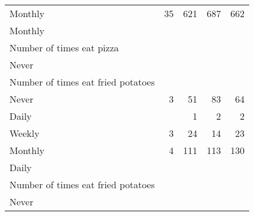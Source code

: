 \documentclass{article}
\begin{document}
\begin{tabular}{lllll}
\multicolumn{1}{l}{\hspace{5em}Monthly} &
  \multicolumn{1}{|r}{35} &
  \multicolumn{1}{r}{621} &
  \multicolumn{1}{r}{687} &
  \multicolumn{1}{r}{662} \\
\multicolumn{1}{l}{\hspace{1em}Monthly} &
  \multicolumn{1}{|r}{} &
  \multicolumn{1}{r}{} &
  \multicolumn{1}{r}{} &
  \multicolumn{1}{r}{} \\
\multicolumn{1}{l}{\hspace{2em}Number of times eat pizza} &
  \multicolumn{1}{|r}{} &
  \multicolumn{1}{r}{} &
  \multicolumn{1}{r}{} &
  \multicolumn{1}{r}{} \\
\multicolumn{1}{l}{\hspace{3em}Never} &
  \multicolumn{1}{|r}{} &
  \multicolumn{1}{r}{} &
  \multicolumn{1}{r}{} &
  \multicolumn{1}{r}{} \\
\multicolumn{1}{l}{\hspace{4em}Number of times eat fried potatoes} &
  \multicolumn{1}{|r}{} &
  \multicolumn{1}{r}{} &
  \multicolumn{1}{r}{} &
  \multicolumn{1}{r}{} \\
\multicolumn{1}{l}{\hspace{5em}Never} &
  \multicolumn{1}{|r}{3} &
  \multicolumn{1}{r}{51} &
  \multicolumn{1}{r}{83} &
  \multicolumn{1}{r}{64} \\
\multicolumn{1}{l}{\hspace{5em}Daily} &
  \multicolumn{1}{|r}{} &
  \multicolumn{1}{r}{1} &
  \multicolumn{1}{r}{2} &
  \multicolumn{1}{r}{2} \\
\multicolumn{1}{l}{\hspace{5em}Weekly} &
  \multicolumn{1}{|r}{3} &
  \multicolumn{1}{r}{24} &
  \multicolumn{1}{r}{14} &
  \multicolumn{1}{r}{23} \\
\multicolumn{1}{l}{\hspace{5em}Monthly} &
  \multicolumn{1}{|r}{4} &
  \multicolumn{1}{r}{111} &
  \multicolumn{1}{r}{113} &
  \multicolumn{1}{r}{130} \\
\multicolumn{1}{l}{\hspace{3em}Daily} &
  \multicolumn{1}{|r}{} &
  \multicolumn{1}{r}{} &
  \multicolumn{1}{r}{} &
  \multicolumn{1}{r}{} \\
\multicolumn{1}{l}{\hspace{4em}Number of times eat fried potatoes} &
  \multicolumn{1}{|r}{} &
  \multicolumn{1}{r}{} &
  \multicolumn{1}{r}{} &
  \multicolumn{1}{r}{} \\
\multicolumn{1}{l}{\hspace{5em}Never} &

\end{tabular}
\end{document}
